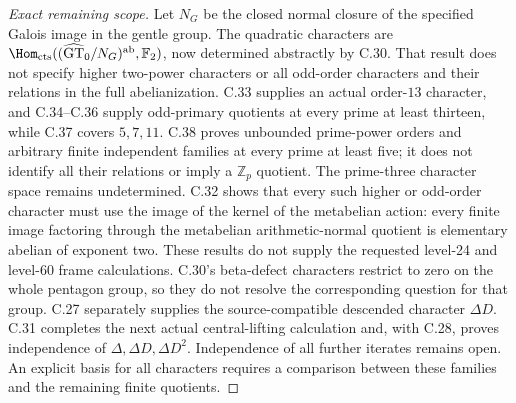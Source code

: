 \begin{proof}[Exact remaining scope]
Let $N_G$ be the closed normal closure of the specified Galois image
in the gentle group. The quadratic characters are
$\Hom_{\mathrm{cts}}((\widehat{\mathrm{GT}}_0/N_G)^{\mathrm{ab}},
\mathbb F_2)$, now determined abstractly by C.30. That result does not
specify higher two-power characters or all odd-order characters and
their relations in the full abelianization. C.33 supplies an actual
order-$13$ character, and C.34--C.36 supply odd-primary quotients
at every prime at least thirteen, while C.37 covers $5,7,11$.
C.38 proves unbounded prime-power orders and arbitrary finite
independent families at every prime at least five; it does not
identify all their relations or imply a $\mathbb Z_p$ quotient.
The prime-three character space remains undetermined.
C.32 shows that every such higher
or odd-order character must use the image of the kernel of
the metabelian action: every finite image factoring through the
metabelian arithmetic-normal quotient is elementary abelian of
exponent two. These results do not supply the requested level-24 and
level-60 frame calculations. C.30's beta-defect characters
restrict to zero on the whole pentagon group, so they do not resolve
the corresponding question for that group. C.27 separately supplies
the source-compatible descended character $\Delta D$. C.31 completes
the next actual central-lifting calculation and, with C.28, proves
independence of $\Delta,\Delta D,\Delta D^2$. Independence of all
further iterates remains open. An explicit basis for all characters
requires a comparison between these families and the remaining
finite quotients.
\end{proof}


